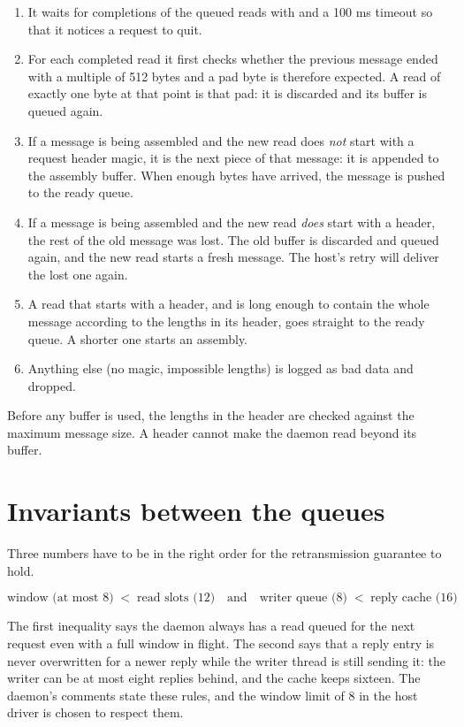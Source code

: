 \begin{enumerate}
  \item It waits for completions of the queued reads with  and a 100 ms timeout so that it notices a request to quit.
  \item For each completed read it first checks whether the previous message ended with a multiple of 512 bytes and a pad byte is therefore expected. A read of exactly one byte at that point is that pad: it is discarded and its buffer is queued again.
  \item If a message is being assembled and the new read does \emph{not} start with a request header magic, it is the next piece of that message: it is appended to the assembly buffer. When enough bytes have arrived, the message is pushed to the ready queue.
  \item If a message is being assembled and the new read \emph{does} start with a header, the rest of the old message was lost. The old buffer is discarded and queued again, and the new read starts a fresh message. The host's retry will deliver the lost one again.
  \item A read that starts with a header, and is long enough to contain the whole message according to the lengths in its header, goes straight to the ready queue. A shorter one starts an assembly.
  \item Anything else (no magic, impossible lengths) is logged as bad data and dropped.
\end{enumerate}

Before any buffer is used, the lengths in the header are checked against the maximum message size. A header cannot make the daemon read beyond its buffer.

\section{Invariants between the queues}

Three numbers have to be in the right order for the retransmission guarantee to hold.

\[
\text{window (at most 8)} \;<\; \text{read slots (12)} \quad\text{and}\quad \text{writer queue (8)} \;<\; \text{reply cache (16)}
\]

The first inequality says the daemon always has a read queued for the next request even with a full window in flight. The second says that a reply entry is never overwritten for a newer reply while the writer thread is still sending it: the writer can be at most eight replies behind, and the cache keeps sixteen. The daemon's comments state these rules, and the window limit of 8 in the host driver is chosen to respect them.

